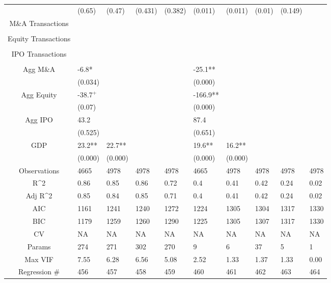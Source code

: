\documentclass{article}
\begin{document}
\begin{table}[H]
\begin{tabular}{|clllllllll|}
   & (0.65) & (0.47) & (0.431) & (0.382) & (0.011) & (0.011) & (0.01) & (0.149) &  \\
  M\&A Transactions &  &  &  &  &  &  &  &  &  \\
   &  &  &  &  &  &  &  &  &  \\
  Equity Transactions &  &  &  &  &  &  &  &  &  \\
   &  &  &  &  &  &  &  &  &  \\
  IPO Transactions &  &  &  &  &  &  &  &  &  \\
   &  &  &  &  &  &  &  &  &  \\
  Agg M\&A & -6.8* &  &  &  & -25.1** &  &  &  &  \\
   & (0.034) &  &  &  & (0.000) &  &  &  &  \\
  Agg Equity & -38.7$^{+}$ &  &  &  & -166.9** &  &  &  &  \\
   & (0.07) &  &  &  & (0.000) &  &  &  &  \\
  Agg IPO & 43.2 &  &  &  & 87.4 &  &  &  &  \\
   & (0.525) &  &  &  & (0.651) &  &  &  &  \\
  GDP & 23.2** & 22.7** &  &  & 19.6** & 16.2** &  &  &  \\
   & (0.000) & (0.000) &  &  & (0.000) & (0.000) &  &  &  \\
  \hline
 Observations & 4665 & 4978 & 4978 & 4978 & 4665 & 4978 & 4978 & 4978 & 4978 \\
  R^2 & 0.86 & 0.85 & 0.86 & 0.72 & 0.4 & 0.41 & 0.42 & 0.24 & 0.02 \\
  Adj R^2 & 0.85 & 0.84 & 0.85 & 0.71 & 0.4 & 0.41 & 0.42 & 0.24 & 0.02 \\
  AIC & 1161 & 1241 & 1240 & 1272 & 1224 & 1305 & 1304 & 1317 & 1330 \\
  BIC & 1179 & 1259 & 1260 & 1290 & 1225 & 1305 & 1307 & 1317 & 1330 \\
  CV & NA & NA & NA & NA & NA & NA & NA & NA & NA \\
  Params & 274 & 271 & 302 & 270 & 9 & 6 & 37 & 5 & 1 \\
  Max VIF & 7.55 & 6.28 & 6.56 & 5.08 & 2.52 & 1.33 & 1.37 & 1.33 & 0.00 \\
  Regression \# & 456 & 457 & 458 & 459 & 460 & 461 & 462 & 463 & 464 \\
   \hline
\end{tabular}

\end{table}
\end{document}
